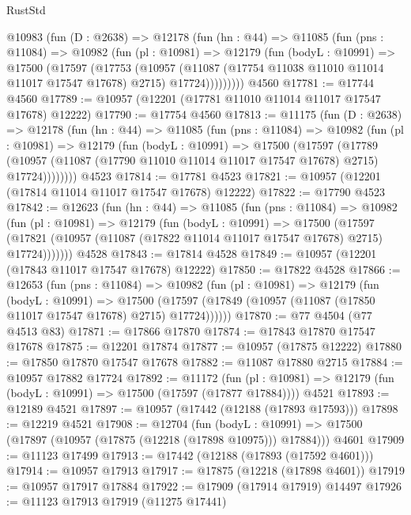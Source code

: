 \begin{lexlean}{RustStd}
\begin{coremodule}
{\begin{coremodule}
{{{{{{{{{{{{{{{{{{{{{{{{{{{{{{{{{    @10983
      (fun (D : @2638) =>
      @12178
        (fun (hn : @44) =>
        @11085
          (fun (pns : @11084) =>
          @10982
            (fun (pl : @10981) =>
            @12179
              (fun (bodyL : @10991) =>
              @17500
                (@17597
                  (@17753
                    (@10957
                      (@11087 (@17754 @11038 @11010 @11014 @11017 @17547 @17678) @2715)
                      @17724)))))))))
    @4560
@17781 := @17744 @4560
@17789 := @10957 (@12201 (@17781 @11010 @11014 @11017 @17547 @17678) @12222)
@17790 := @17754 @4560
@17813 := @11175
    (fun (D : @2638) =>
    @12178
      (fun (hn : @44) =>
      @11085
        (fun (pns : @11084) =>
        @10982
          (fun (pl : @10981) =>
          @12179
            (fun (bodyL : @10991) =>
            @17500
              (@17597
                (@17789
                  (@10957 (@11087 (@17790 @11010 @11014 @11017 @17547 @17678) @2715) @17724))))))))
    @4523
@17814 := @17781 @4523
@17821 := @10957 (@12201 (@17814 @11014 @11017 @17547 @17678) @12222)
@17822 := @17790 @4523
@17842 := @12623
    (fun (hn : @44) =>
    @11085
      (fun (pns : @11084) =>
      @10982
        (fun (pl : @10981) =>
        @12179
          (fun (bodyL : @10991) =>
          @17500
            (@17597
              (@17821 (@10957 (@11087 (@17822 @11014 @11017 @17547 @17678) @2715) @17724)))))))
    @4528
@17843 := @17814 @4528
@17849 := @10957 (@12201 (@17843 @11017 @17547 @17678) @12222)
@17850 := @17822 @4528
@17866 := @12653
    (fun (pns : @11084) =>
    @10982
      (fun (pl : @10981) =>
      @12179
        (fun (bodyL : @10991) =>
        @17500 (@17597 (@17849 (@10957 (@11087 (@17850 @11017 @17547 @17678) @2715) @17724))))))
@17870 := @77 @4504 (@77 @4513 @83)
@17871 := @17866 @17870
@17874 := @17843 @17870 @17547 @17678
@17875 := @12201 @17874
@17877 := @10957 (@17875 @12222)
@17880 := @17850 @17870 @17547 @17678
@17882 := @11087 @17880 @2715
@17884 := @10957 @17882 @17724
@17892 := @11172
    (fun (pl : @10981) => @12179 (fun (bodyL : @10991) => @17500 (@17597 (@17877 @17884))))
    @4521
@17893 := @12189 @4521
@17897 := @10957 (@17442 (@12188 (@17893 @17593)))
@17898 := @12219 @4521
@17908 := @12704
    (fun (bodyL : @10991) => @17500 (@17897 (@10957 (@17875 (@12218 (@17898 @10975))) @17884)))
    @4601
@17909 := @11123 @17499
@17913 := @17442 (@12188 (@17893 (@17592 @4601)))
@17914 := @10957 @17913
@17917 := @17875 (@12218 (@17898 @4601))
@17919 := @10957 @17917 @17884
@17922 := @17909 (@17914 @17919) @14497
@17926 := @11123 @17913 @17919 (@11275 @17441)
}}}}}}}}}}}}}}}}}}}}}}}}}}}}}}}}}
\end{coremodule}}
\end{coremodule}
\end{lexlean}
